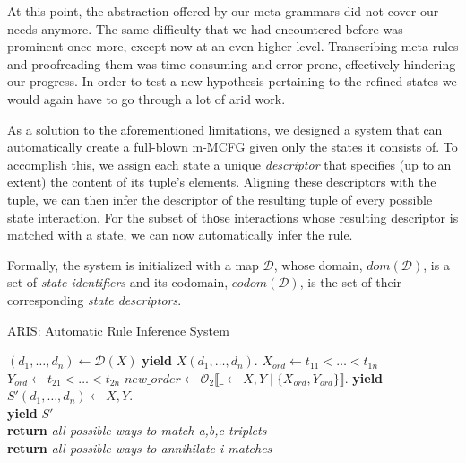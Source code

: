 \documentclass[nonatbib,numbers,10pt]{sigplanconf}
\newcommand{\Orderr}[5]{
	\mathcal{#1}_{#5}\llbracket #2 \leftarrow #3 \mid \{ #4 \} \rrbracket.
}
\newcommand{\Or}[4]{\Orderr{O}{#1}{#2}{#3}{#4}}
\begin{document}
At this point, the abstraction offered by our meta-grammars did not cover our needs anymore. The same difficulty that we had encountered before was prominent once more, except now at an even higher level. Transcribing meta-rules and proofreading them was time consuming and error-prone, effectively hindering our progress. In order to test a new hypothesis pertaining to the refined states we would again have to go through a lot of arid work.

As a solution to the aforementioned limitations, we designed a system that can automatically create a full-blown m-MCFG given only the states it consists of. To accomplish this, we assign each state a unique \textit{descriptor} that specifies (up to an extent) the content of its tuple's elements. Aligning these descriptors with the tuple, we can then infer the descriptor of the resulting tuple of every possible state interaction. For the subset of thοse interactions whose resulting descriptor is matched with a state, we can now automatically infer the rule.

Formally, the system is initialized with a map $\mathcal{D}$, whose domain, $dom(\mathcal{D})$, is a set of \textit{state identifiers} and its codomain, $codom(\mathcal{D})$, is the set of their corresponding \textit{state descriptors}.

\begin{algorithm}
\caption{ARIS: Automatic Rule Inference System}\label{euclid}
\begin{algorithmic}
		\State $(d_1,\dots ,d_n) \leftarrow \mathcal{D}(X)$
		\State \textbf{yield} $X(d_1,\dots,d_n).$
	\EndFor
		\State $X_{ord} \leftarrow t_{11}<\dots<t_{1n}$ 
		\State $Y_{ord} \leftarrow t_{21}<\dots<t_{2n}$ 
		\State $new\_order \leftarrow \Or{\_}{X,Y}{X_{ord}, Y_{ord}}{2}$
				\State \textbf{yield} $S'(d_1,\dots ,d_n) \leftarrow X, Y.$
			\EndFor
		\EndFor
	\EndFor
\EndProcedure
\\
					\State \textbf{yield} $S'$
				\EndIf				
			\EndFor
		\EndFor
	\EndFor
\EndProcedure
\\
	\State \textbf{return} \textit{all possible ways to match a,b,c triplets}
\EndProcedure
\\
	\State \textbf{return} \textit{all possible ways to annihilate i matches}
\EndProcedure
\end{algorithmic}
\end{algorithm}
\end{document}
